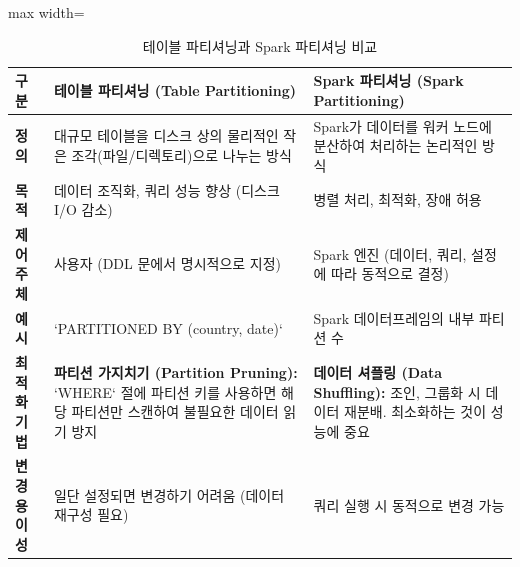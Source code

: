 \documentclass[11pt,a4paper]{article}
\begin{document}
\begin{table}[h!]
\centering
\caption{테이블 파티셔닝과 Spark 파티셔닝 비교}
\label{tab:partitioning_comparison}
\begin{adjustbox}{max width=\textwidth}
\begin{tabular}{p{}p{}p{}}
\toprule
\textbf{구분} & \textbf{테이블 파티셔닝 (Table Partitioning)} & \textbf{Spark 파티셔닝 (Spark Partitioning)} \\
\midrule
\textbf{정의} & 대규모 테이블을 디스크 상의 물리적인 작은 조각(파일/디렉토리)으로 나누는 방식 & Spark가 데이터를 워커 노드에 분산하여 처리하는 논리적인 방식 \\
\textbf{목적} & 데이터 조직화, 쿼리 성능 향상 (디스크 I/O 감소) & 병렬 처리, 최적화, 장애 허용 \\
\textbf{제어 주체} & 사용자 (DDL 문에서 명시적으로 지정) & Spark 엔진 (데이터, 쿼리, 설정에 따라 동적으로 결정) \\
\textbf{예시} & `PARTITIONED BY (country, date)` & Spark 데이터프레임의 내부 파티션 수 \\
\textbf{최적화 기법} & \textbf{파티션 가지치기 (Partition Pruning):} `WHERE` 절에 파티션 키를 사용하면 해당 파티션만 스캔하여 불필요한 데이터 읽기 방지 & \textbf{데이터 셔플링 (Data Shuffling):} 조인, 그룹화 시 데이터 재분배. 최소화하는 것이 성능에 중요 \\
\textbf{변경 용이성} & 일단 설정되면 변경하기 어려움 (데이터 재구성 필요) & 쿼리 실행 시 동적으로 변경 가능 \\
\bottomrule
\end{tabular}
\end{adjustbox}
\end{table}
\end{document}
